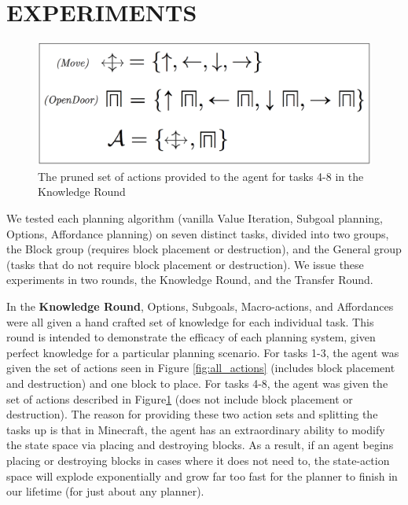 \documentclass[]{article}
\begin{document}
\section{EXPERIMENTS}

\begin{figure}
\centering
\includegraphics[scale=0.2]{figures/reg_actions.png}
\caption{The pruned set of actions provided to the agent for tasks 4-8 in the Knowledge Round \label{fig:reg_actions}}
\end{figure}

We tested each planning algorithm (vanilla Value Iteration, Subgoal planning, Options, Affordance planning) on seven distinct tasks, divided into two groups, the Block group (requires block placement or destruction), and the General group (tasks that do not require block placement or destruction). We issue these experiments in two rounds, the Knowledge Round, and the Transfer Round.



In the {\bf Knowledge Round}, Options, Subgoals, Macro-actions, and Affordances were all given a hand crafted set of knowledge for each individual task. This round is intended to demonstrate the efficacy of each planning system, given perfect knowledge for a particular planning scenario. For tasks 1-3, the agent was given the set of actions seen in Figure \ref{fig:all_actions} (includes block placement and destruction) and one block to place. For tasks 4-8, the agent was given the set of actions described in Figure\ref{fig:reg_actions} (does not include block placement or destruction). The reason for providing these two action sets and splitting the tasks up is that in Minecraft, the agent has an extraordinary ability to modify the state space via placing and destroying blocks. As a result, if an agent begins placing or destroying blocks in cases where it does not need to, the state-action space will explode exponentially and grow far too fast for the planner to finish in our lifetime (for just about any planner). 
\end{document}
